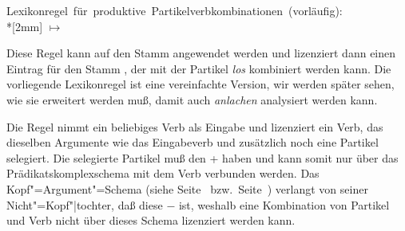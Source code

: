 \eas
\label{lr-pv-prel}%
\mbox{Lexikonregel für produktive Partikelverbkombinationen (vorläufig):}\\*[2mm]
\onems[stem]{
           synsem \ibox{1} \onems{ loc$|$cat \ms{ head & \type{verb} \\ 
                                                  subcat & \ibox{2}\\
}
                                 } \\
         }  $\mapsto$ \\
%
%
\zs

\noindent
Diese Regel kann auf den Stamm  angewendet werden
und lizenziert dann einen Eintrag für den Stamm , der mit der Partikel \emph{los}
kombiniert werden kann. Die vorliegende Lexikonregel ist eine vereinfachte Version, wir
werden später sehen, wie sie erweitert werden muß, damit auch \emph{anlachen}
analysiert werden kann.


Die Regel nimmt ein beliebiges Verb als Eingabe und lizenziert ein Verb,
das dieselben Argumente wie das Eingabeverb und zusätzlich noch eine Partikel selegiert.
Die selegierte Partikel muß den \lexw + haben und kann somit nur über
das Prädikatskomplexschema mit dem Verb verbunden werden. Das Kopf"=Argument"=Schema
(siehe Seite~\pageref{schema-bin} bzw.\ Seite~\pageref{schema-bin-mark-final}) verlangt von seiner
Nicht"=Kopf"|tochter, daß diese \lex$-$ ist, weshalb eine Kombination von Partikel und Verb nicht
über dieses Schema lizenziert werden kann.

